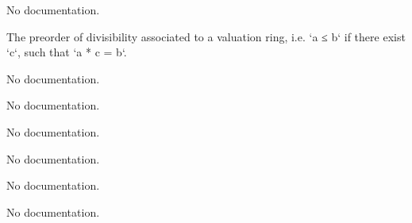\begin{definition}
\begin{definition}\label{CompleteDiscreteValuedField}
        \leanok
                No documentation.
    \end{definition}

\begin{definition}\label{ValuationRingTopology.ValuationRing.setoid}
                The preorder of divisibility associated to a valuation ring, i.e. `a ≤ b` if there exist `c`, such that `a * c = b`.
    \end{definition}

\begin{definition}\label{ValuationRingTopology.ValuationRing.ValueMonoid}
                No documentation.
    \end{definition}

\begin{definition}\label{ValuationRingTopology.Valuation.leIdeal}
                No documentation.
    \end{definition}

\begin{definition}\label{ValuationRingTopology.Valuation.ltIdeal}
                No documentation.
    \end{definition}

\begin{definition}\label{ValuationRingTopology.Valuation.maximalIdeal}
                No documentation.
    \end{definition}

\begin{theorem}\label{Valued.le_iff_val_le}
                No documentation.
    \end{theorem}

\begin{theorem}\label{Valued.lt_iff_val_lt}
                No documentation.
    \end{theorem}


\end{definition}
